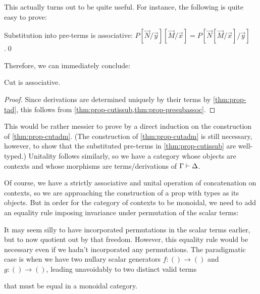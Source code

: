 \begin{props}
This actually turns out to be quite useful.
For instance, the following is quite easy to prove:

\begin{lem}\label{thm:prop-presubassoc}
  Substitution into pre-terms is associative: $P[\vec N/\vec y][\vec M/\vec x] = P[\vec N[\vec M/\vec x]/\vec y]$.\qed
\end{lem}

Therefore, we can immediately conclude:

\begin{thm}\label{thm:prop-cutassoc}
  Cut is associative.
\end{thm}
\begin{proof}
  Since derivations are determined uniquely by their terms by \cref{thm:prop-tad}, this follows from \cref{thm:prop-cutissub,thm:prop-presubassoc}.
\end{proof}

This would be rather messier to prove by a direct induction on the construction of \cref{thm:prop-cutadm}.
(The construction of \cref{thm:prop-cutadm} is still necessary, however, to show that the substituted pre-terms in \cref{thm:prop-cutissub} are well-typed.)
Unitality follows similarly, so we have a category whose objects are contexts and whose morphisms are terms/derivations of $\Gamma\types\Delta$.

Of course, we have a strictly associative and unital operation of concatenation on contexts, so we are approaching the construction of a prop with types as its objects.
But in order for the category of contexts to be monoidal, we need to add an equality rule imposing invariance under permutation of the scalar terms:
\begin{mathpar}
\end{mathpar}
It may seem silly to have incorporated permutations in the scalar terms earlier, but to now quotient out by that freedom.
However, this equality rule would be necessary even if we hadn't incorporated any permutations.
The paradigmatic case is when we have two nullary scalar generators $f:() \to ()$ and $g:()\to ()$, leading unavoidably to two distinct valid terms
that must be equal in a monoidal category.


\end{props}
